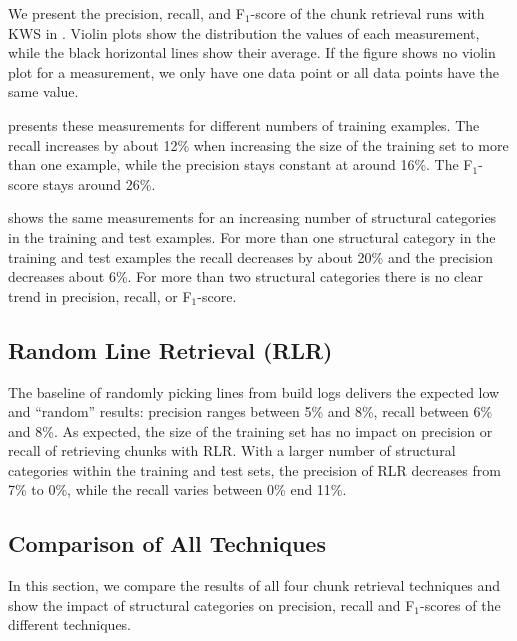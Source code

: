 We present the precision,
recall, and F$_{1}$-score of the chunk retrieval runs with KWS in
.
Violin plots show the distribution the values of each measurement,
while the black horizontal lines show their average.
If the figure shows no violin plot for a measurement, we only have one
data point or all data points have the same value.

 presents these
measurements for different
numbers of training examples.
The recall increases by about 12\% when
increasing the size of the training set to more than one example,
while the precision stays constant at around 16\%.
The F$_{1}$-score
stays around 26\%.

 shows the same
measurements for an increasing number of structural categories in the
training and test examples.
For more than one structural category in
the training and test examples the recall decreases by about 20\% and
the precision decreases about 6\%.
For more than two structural
categories there is no clear trend in precision, recall, or
F$_{1}$-score.

\subsection{Random Line Retrieval (RLR)}
\label{sec:r:rlr}
The baseline of randomly
picking lines from build logs delivers the expected low and
``random'' results: precision ranges between 5\% and 8\%,
recall between 6\% and 8\%.
As expected, the size of the training set has no impact on precision
or recall of retrieving chunks with RLR.
With a larger number of structural categories within the training and
test sets, the precision of RLR decreases from 7\% to 0\%, while
the recall varies between 0\% end 11\%.

\subsection{Comparison of All Techniques}
In this section, we compare the results of all four chunk retrieval
techniques and show the impact of structural categories on precision,
recall and F$_{1}$-scores of the different techniques.

